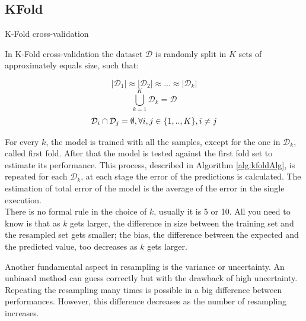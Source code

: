 \subsection{KFold}

\begin{algorithm}
	\caption{K-Fold cross-validation}\label{alg:kfoldAlg}
	\begin{algorithmic}[1]
		 
		
		
		\EndFor
		
	\end{algorithmic}
\end{algorithm}

In K-Fold cross-validation the dataset $\mathcal{D}$ is randomly split in $K$ sets of approximately equals size, such that: \cite{ghojogh2019theory} \cite{kuhn2013applied}

\[|\mathcal{D}_1| \approx |\mathcal{D}_2| \approx ... \approx |\mathcal{D}_k|
\]
\[
\bigcup_{k=1}^{K} \mathcal{D}_{k} = \mathcal{D}
\]
\[
 \mathcal{D}_i \cap \mathcal{D}_j = \emptyset, \space \forall i,j \in \{1, .., K \}, i \neq j
\]

For every $k$, the model is trained with all the samples, except for the one in $\mathcal{D}_k$, called first fold. After that the model is tested against the first fold set to estimate its performance. This process, described in Algorithm \ref{alg:kfoldAlg}, is repeated for each $\mathcal{D}_k$, at each stage the error of the predictions is calculated. The estimation of total error of the model is the average of the error in the single execution.\\

There is no formal rule in the choice of $k$, usually it is 5 or 10. All you need to know is that as $k$ gets larger, the difference in size between the training set and the resampled set gets smaller; the bias, the difference between the expected and the predicted value, too decreases as $k$ gets larger.

Another fundamental aspect in resampling is the variance or uncertainty. An unbiased method can guess correctly but with the drawback of high uncertainty. Repeating the resampling many times is possible in a big difference between performances. However, this difference decreases as the number of resampling increases.\\

